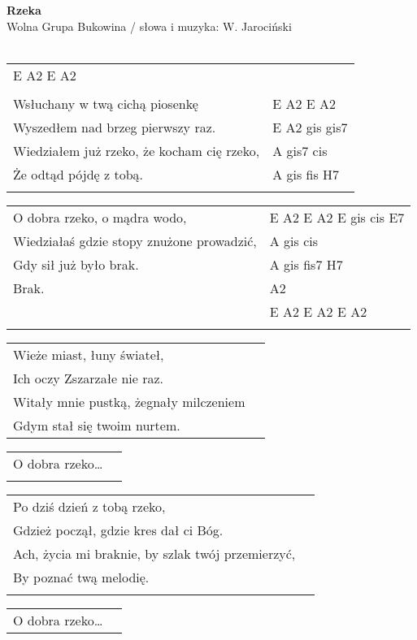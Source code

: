 \documentclass[a5paper]{article}
\begin{document}


\noindent
\fontsize{12pt}{15pt}\selectfont
\textbf{Rzeka} \\
\fontsize{8pt}{10pt}\selectfont
Wolna Grupa Bukowina / słowa i muzyka: W. Jarociński \\ \\
\fontsize{10pt}{12pt}\selectfont
{}
\begin{tabular}{@{}p{7.50cm}p{3cm}@{}}
\noindent
E A2 E A2 \\ \\

Wsłuchany w twą cichą piosenkę & E A2  E A2 \\
Wyszedłem nad brzeg pierwszy raz.  & E A2  gis gis7 \\
Wiedziałem już rzeko, że kocham cię rzeko, & A gis7 cis \\
Że odtąd pójdę z tobą. & A gis fis H7 \\ \\
\end{tabular}

\noindent
\begin{tabular}{@{}p{6.50cm}p{4cm}@{}}
O dobra rzeko, o mądra wodo, & E A2 E A2 E gis cis E7 \\
Wiedziałaś gdzie stopy znużone prowadzić, & A gis cis \\
Gdy sił już było brak.  & A gis fis7 H7 \\
Brak. & A2 \\
& E A2 E A2 E A2 \\ \\
\end{tabular}

\noindent
\begin{tabular}{@{}p{8.00cm}p{3cm}@{}}
Wieże miast, łuny świateł, \\
Ich oczy Zszarzałe nie raz. \\
Witały mnie pustką, żegnały milczeniem \\
Gdym stał się twoim nurtem. \\
\end{tabular}

\noindent
\begin{tabular}{@{}p{8.00cm}p{3cm}@{}}
	O dobra rzeko… \\ \\
\end{tabular}

\noindent
\begin{tabular}{@{}p{8.00cm}p{3cm}@{}}
Po dziś dzień z tobą rzeko, \\
Gdzież począł, gdzie kres dał ci Bóg. \\
Ach, życia mi braknie, by szlak twój przemierzyć, \\
By poznać twą melodię. \\ \\
\end{tabular}

\noindent
\begin{tabular}{@{}p{8.00cm}p{3cm}@{}}
O dobra rzeko…
\end{tabular}
\end{document}
